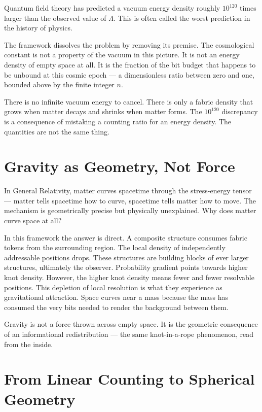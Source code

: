 Quantum field theory has predicted a vacuum energy density
roughly $10^{120}$ times larger than the observed value of $\Lambda$.
This is often called the worst prediction in the history of physics.

The framework dissolves the problem by removing its premise. The
cosmological constant is not a property of the vacuum in this picture.
It is not an energy density of empty space at all. It is the fraction of
the bit budget that happens to be unbound at this cosmic epoch --- a
dimensionless ratio between zero and one, bounded above by the finite
integer $n$.

There is no infinite vacuum energy to cancel. There is only a fabric
density that grows when matter decays and shrinks when matter forms. The
$10^{120}$ discrepancy is a consequence of mistaking a counting ratio
for an energy density. The quantities are not the same thing.

\section{Gravity as Geometry, Not Force}

In General Relativity, matter curves spacetime through the stress-energy
tensor --- matter tells spacetime how to curve, spacetime tells matter
how to move. The mechanism is geometrically precise but physically
unexplained. Why does matter curve space at all?

In this framework the answer is direct. A composite structure consumes
fabric tokens from the surrounding region. The local density of
independently addressable positions drops. These structures are
building blocks of ever larger structures, ultimately the observer.
Probability gradient points towards higher knot density. However,
the higher knot density means fewer and fewer resolvable positions.
This depletion of local resolution is what they
experience as gravitational attraction. Space curves near a mass because
the mass has consumed the very bits needed to render the background
between them.

Gravity is not a force thrown across empty space. It is the geometric
consequence of an informational redistribution --- the same knot-in-a-rope
phenomenon, read from the inside.

\section{From Linear Counting to Spherical Geometry}

